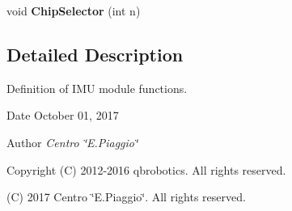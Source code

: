 \begin{DoxyCompactItemize}
\begin{DoxyCompactList}
 \end{DoxyCompactList}\item 
\mbox{\label{_i_m_u__functions_8h_a3bb201c102e53b1b56398272fa105fbb}} 
void {\bfseries Chip\+Selector} (int n)
\end{DoxyCompactItemize}


\subsection{Detailed Description}
Definition of I\+MU module functions. 

\begin{DoxyDate}{Date}
October 01, 2017 
\end{DoxyDate}
\begin{DoxyAuthor}{Author}
{\itshape Centro \char`\"{}\+E.\+Piaggio\char`\"{}} 
\end{DoxyAuthor}
\begin{DoxyCopyright}{Copyright}
(C) 2012-\/2016 qbrobotics. All rights reserved. 

(C) 2017 Centro \char`\"{}\+E.\+Piaggio\char`\"{}. All rights reserved. 
\end{DoxyCopyright}
